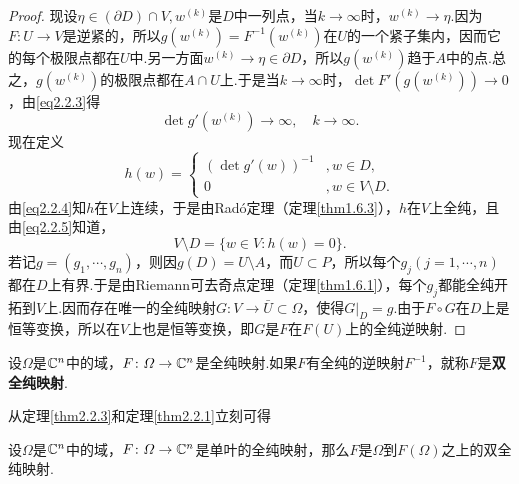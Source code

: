 \begin{proof}
现设$\eta\in(\partial D)\cap V,w^{(k)}$是$D$中一列点，当$k\to\infty$时，$w^{(k)}\to\eta$.因为$F\colon U\to V$是逆紧的，所以$g(w^{(k)})=F^{-1}(w^{(k)})$在$U$的一个紧子集内，因而它的每个极限点都在$U$中.另一方面$w^{(k)}\to\eta\in\partial D$，所以$g(w^{(k)})$趋于$A$中的点.总之，$g(w^{(k)})$的极限点都在$A\cap U$上.于是当$k\to\infty$时，$\det F'(g(w^{(k)}))\to 0$，由\eqref{eq2.2.3}得
\begin{equation}\label{eq2.2.4}
	\det g'(w^{(k)})\to\infty,\quad k\to\infty.
\end{equation}
现在定义
\begin{equation}\label{eq2.2.5}
	h(w)=
	\begin{cases}
		(\det g'(w))^{-1} &,w\in D,\\
		0 &,w\in V\setminus D.
	\end{cases}
\end{equation}
由\eqref{eq2.2.4}知$h$在$V$上连续，于是由Rad\'o定理（定理\ref{thm1.6.3}），$h$在$V$上全纯，且由\eqref{eq2.2.5}知道，
\[V\setminus D=\{w\in V\colon h(w)=0\}.\]
若记$g=(g_1,\cdots,g_n)$，则因$g(D)=U\setminus A$，而$U\subset P$，所以每个$g_j(j=1,\cdots,n)$都在$D$上有界.于是由Riemann可去奇点定理（定理\ref{thm1.6.1}），每个$g_j$都能全纯开拓到$V$上.因而存在唯一的全纯映射$G\colon V\to\bar{U}\subset\Omega$，使得$G|_D=g$.由于$F\circ G$在$D$上是恒等变换，所以在$V$上也是恒等变换，即$G$是$F$在$F(U)$上的全纯逆映射.
\end{proof}
\begin{definition}\label{def2.2.4}
	设$\Omega$是$\mathbb C^n$中的域，$F\colon \varOmega\to\mathbb C^n$是全纯映射.如果$F$有全纯的逆映射$F^{-1}$，就称$F$是\textbf{双全纯映射}.
\end{definition}
从定理\ref{thm2.2.3}和定理\ref{thm2.2.1}立刻可得
\begin{corollary}\label{cor2.2.5}
	设$\Omega$是$\mathbb C^n$中的域，$F\colon \varOmega\to\mathbb C^n$是单叶的全纯映射，那么$F$是$\Omega$到$F(\Omega)$之上的双全纯映射.
\end{corollary}
